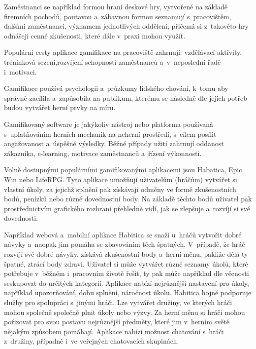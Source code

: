 \documentclass[12pt]{article}
\begin{document}
\par 
Zaměstnanci se například formou hraní deskové hry, vytvořené na základě firemních pochodů,
poutavou a~zábavnou formou seznamují s~pracovištěm, dalšími zaměstnanci, 
významem jednotlivých oddělení,
přičemž si z~takovéto hry odnášejí cenné zkušenosti, které dále v~praxi mohou využít.

\par

Populární cesty aplikace gamifikace na pracoviště zahrnují: vzdělávací aktivity,
tréninková sezení,rozvíjení schopností zaměstnanců a~v~neposlední řadě i~motivaci.

Gamifikace používá psychologii a~průzkumy lidského chování, k~tomu aby správně zacílila a~zapůsobila na publikum,
kterému se následně dle jejich potřeb budou vytvářet herní prvky na míru.


Gamifikovaný software je jakýkoliv nástroj nebo platforma používaná s~uplatňováním herních mechanik na neherní prostředí,
s~cílem posílit angažovanost a~úspěšné výsledky.
Běžné případy užití zahrnují oddanost zákazníka, e-learning, motivace zaměstnanců a~řízení výkonnosti. 

\par

Volně dostupnými populárními gamifikovanými aplikacemi jsou Habatica, Epic Win nebo LifeRPG. 
Tyto aplikace umožňují uživatelům (hráčům) vytvářet si vlastní úkoly, 
za jejichž splnění pak získávají odměny ve formě zkušenostních bodů,
penízků nebo různé dovednostní body. 
Na základě těchto bodů uživatel pak prostřednictvím grafického rozhraní přehledně vidí,
jak se zlepšuje a~rozvíjí si své dovednosti. 

\par

Například webová a~mobilní aplikace Habitica se snaží u~hráčů vytvořit dobré návyky
a~naopak jim pomáha se zbavováním těch špatných.
V~případě, že hráč rozvíjí své dobré návyky,
získává zkušenostní body a~herní měnu, 
pakliže dělá ty špatné, ztrácí body zdraví. 
Uživatel si může vytvářet různé seznamy úkolů,
které potřebuje v~běžném i~pracovním životě řešit,
ty pak může například dle věcnosti seskupovat do určitých kategorií.
Aplikace nabízí nejrůznější nastavení pro úkoly, například upozorňování, dobu splnění, náročnost úkolu.
Habitica hojně podporuje služby pro spolupráci s~jinými hráči. Lze vytvářet družiny,
ve kterých hráči mohou společně společně plnit úkoly nebo výzvy.
Za herní měnu si hráči mohou pořizovat pro svou postavu nejrůznější předměty, 
které jim v~herním světě nějakým způsobem pomáhají. 
Aplikace nabízí možnost chatování s~hráči z~družiny, případně i~ve veřejných chatovacích skupinách.  
\end{document}
